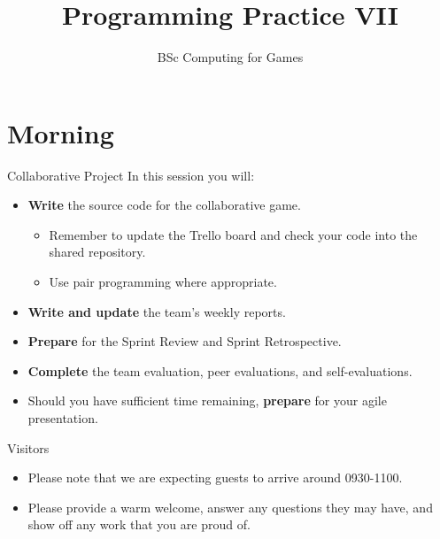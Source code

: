 \documentclass[xcolor={dvipsnames}]{beamer}\usepackage{etoolbox}\newtoggle{printable}\togglefalse{printable}
\begin{document}
\title{Programming Practice VII}   
\subtitle{BSc Computing for Games}

\frame{\titlepage} 

\part{Morning}
\frame{\partpage}

\begin{frame}{Collaborative Project}
	In this session you will:
	
	\begin{itemize}
		\item \textbf{Write} the source code for the collaborative game.
		\begin{itemize}
			\item Remember to update the Trello board and check your code into the shared repository.
			\item Use pair programming where appropriate.
		\end{itemize}
		\item \textbf{Write and update} the team's weekly reports.
		\item\textbf{Prepare} for the Sprint Review and Sprint Retrospective.
		\item \textbf{Complete} the team evaluation, peer evaluations, and self-evaluations.
		\vspace{2ex}
		\item Should you have sufficient time remaining, \textbf{prepare} for your agile presentation.
	\end{itemize}
\end{frame}	
	
\begin{frame}{Visitors}
	\begin{itemize}
		\item Please note that we are expecting guests to arrive around 0930-1100.
		\item Please provide a warm welcome, answer any questions they may have, and show
		off any work that you are proud of.
	\end{itemize}
\end{frame}


%
\end{document}

